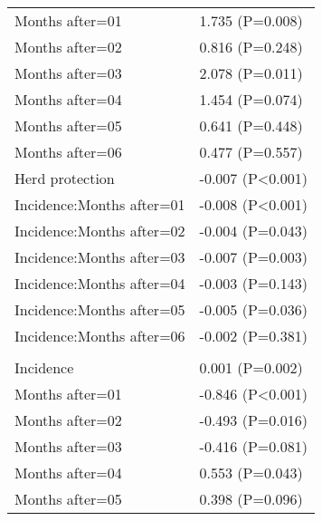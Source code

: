 \documentclass[]{article}
\begin{document}
\begin{longtable}[t]{ll}
\hspace{1em}Months after=01 & 1.735 (P=0.008)\\
\hspace{1em}Months after=02 & 0.816 (P=0.248)\\
\hspace{1em}Months after=03 & 2.078 (P=0.011)\\
\hspace{1em}Months after=04 & 1.454 (P=0.074)\\
\hspace{1em}Months after=05 & 0.641 (P=0.448)\\
\hspace{1em}Months after=06 & 0.477 (P=0.557)\\
\hspace{1em}Herd protection & -0.007 (P<0.001)\\
\hspace{1em}Incidence:Months after=01 & -0.008 (P<0.001)\\
\hspace{1em}Incidence:Months after=02 & -0.004 (P=0.043)\\
\hspace{1em}Incidence:Months after=03 & -0.007 (P=0.003)\\
\hspace{1em}Incidence:Months after=04 & -0.003 (P=0.143)\\
\hspace{1em}Incidence:Months after=05 & -0.005 (P=0.036)\\
\hspace{1em}Incidence:Months after=06 & -0.002 (P=0.381)\\
\addlinespace[1.5em]
\multicolumn{2}{l}{\textbf{Temporary field worker}}\\
\hspace{1em}Incidence & 0.001 (P=0.002)\\
\hspace{1em}Months after=01 & -0.846 (P<0.001)\\
\hspace{1em}Months after=02 & -0.493 (P=0.016)\\
\hspace{1em}Months after=03 & -0.416 (P=0.081)\\
\hspace{1em}Months after=04 & 0.553 (P=0.043)\\
\hspace{1em}Months after=05 & 0.398 (P=0.096)\\

\end{longtable}
\end{document}

